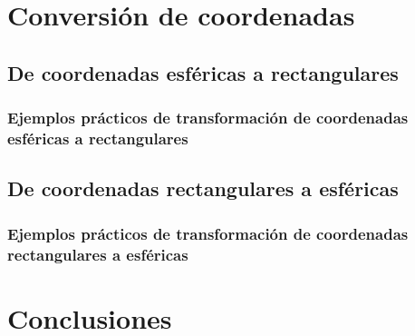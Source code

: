 \documentclass[letterpaper,14pt]{extreport} %
\begin{document}
    \section{Conversión de coordenadas}
      

      \subsection{De coordenadas esféricas a rectangulares}
          

          \subsubsection{Ejemplos prácticos de transformación de coordenadas esféricas a rectangulares}
          

      \subsection{De coordenadas rectangulares a esféricas}
          

          \subsubsection{Ejemplos prácticos de transformación de coordenadas rectangulares a esféricas}
          

    \section{Conclusiones}
      



  \medskip

  \printbibliography[title={Referencias}]
\end{document}
